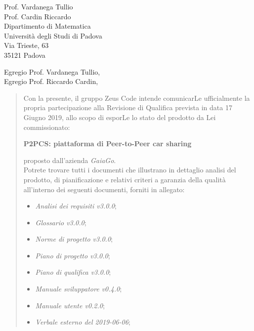 \begin{letter}{
		Prof. Vardanega Tullio \\
		Prof. Cardin Riccardo \\
		Dipartimento di Matematica \\
		Università degli Studi di Padova \\
		Via Trieste, 63 \\
		35121 Padova}
		
\opening{Egregio Prof. Vardanega Tullio,\\Egregio Prof. Riccardo Cardin,}

\begin{quotation}
Con la presente, il gruppo Zeus Code intende comunicarLe ufficialmente la propria partecipazione alla Revisione di Qualifica prevista in data 17 Giugno 2019, allo scopo di esporLe lo stato del prodotto
da Lei commissionato:

\begin{center}
	\textbf{P2PCS: piattaforma di Peer-to-Peer car sharing}
\end{center}

\noindent proposto dall'azienda \textit{GaiaGo}.\\
Potrete trovare tutti i documenti che illustrano in dettaglio analisi del prodotto, di pianificazione e relativi criteri a garanzia della qualità all'interno dei seguenti 
documenti, forniti in allegato:

\bigskip

\begin{itemize}
	\item \textit{Analisi dei requisiti v3.0.0};
	
	\item \textit{Glossario v3.0.0};
	
	\item \textit{Norme di progetto v3.0.0};

	\item \textit{Piano di progetto v3.0.0};

	\item \textit{Piano di qualifica v3.0.0};
	
	\item \textit{Manuale sviluppatore v0.4.0};
	
	\item \textit{Manuale utente v0.2.0};


	\item \textit{Verbale esterno del 2019-06-06};
	

\end{itemize}
\end{quotation}
\end{letter}

